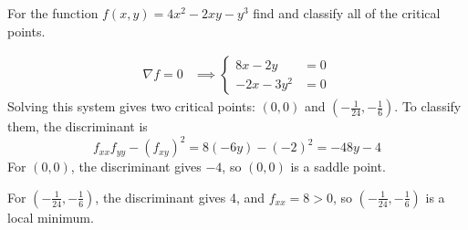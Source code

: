 \documentclass[12pt,answers]{exam}
\begin{document}
\begin{questions}
	\newpage
	\question[14]
	For the function $f(x,y) = 4x^2 - 2xy - y^3$ find and classify all of the critical points.
	\begin{solution}
		\begin{align*}
			\nabla f = 0
			&\implies
			\left\{
				\begin{aligned}
					8x-2y &= 0 \\ 
					-2x -3y^2 &= 0
				\end{aligned}
			\right.
		\end{align*}
		Solving this system gives two critical points: 
		$(0,0)$ and $(-\frac1{24}, -\frac16)$.
		To classify them, the discriminant is
		\[
			f_{xx} f_{yy} - (f_{xy})^2 
			= 8(-6y) - (-2)^2 = -48y - 4
		\]
		For $(0,0)$, the discriminant gives $-4$, so $(0,0)$ is a saddle point.

		For $(-\frac1{24}, -\frac16)$, the discriminant gives 4, and $f_{xx} = 8 > 0$, so $(-\frac1{24}, -\frac16)$ is a local minimum.
	\end{solution}


\end{questions}
\end{document}
